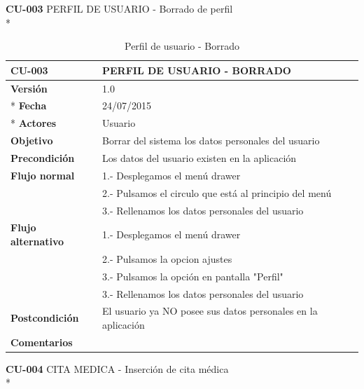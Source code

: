 \documentclass[../pfc.tex]{subfiles}
\begin{document}
		
	\textbf{CU-003}	PERFIL DE USUARIO - Borrado de perfil\\*

	\begin{table}[!hbt]
		\centering
		\begin{tabular}[t]{|p{3cm}|p{9.5cm}|}
			\hline \textbf{CU-003} & \textbf{PERFIL DE USUARIO - BORRADO} \\*
			\hline\hline \textbf{Versión} & 1.0 \\ *
			\hline\hline \textbf{Fecha} & 24/07/2015 \\ *
			\hline\textbf{Actores} 	& Usuario\\*
			\hline \textbf{Objetivo} & Borrar del sistema los datos personales del usuario\\* 			
			\hline \textbf{Precondición} & Los datos del usuario existen en la aplicación \\* 
			\hline \textbf{Flujo normal} & 1.- Desplegamos el menú drawer \\* 
			& 2.- Pulsamos el circulo que está al principio del menú \\*	
			& 3.- Rellenamos los datos personales del usuario\\*	
			\hline \textbf{Flujo alternativo} & 1.- Desplegamos el menú drawer \\* 
			& 2.- Pulsamos la opcion ajustes \\*	
			& 3.- Pulsamos la opción en pantalla "Perfil" \\*	
			& 3.- Rellenamos los datos personales del usuario \\*	
			\hline \textbf{Postcondición} & El usuario ya NO posee sus datos personales en la aplicación \\* 
			\hline \textbf{Comentarios}   &  \\*
			\hline
		\end{tabular}
		\caption{Perfil de usuario - Borrado}
		\label{tabla:caso003}
	\end{table}
	
	
	

	\textbf{CU-004}	CITA MEDICA - Inserción de cita médica\\*
	
\end{document}
